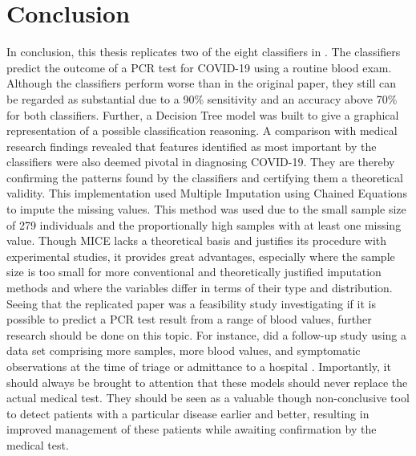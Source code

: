 \section{Conclusion}
In conclusion, this thesis replicates two of the eight classifiers in 
\cite{RN127}. The classifiers predict the outcome of a PCR test for COVID-19 
using a routine blood exam. Although the classifiers perform worse than in the 
original paper, they still can be regarded as substantial due to a 90\% 
sensitivity and an accuracy above 70\% for both classifiers.
Further, a Decision Tree model was built to give a graphical representation of 
a possible classification reasoning.
A comparison with medical research findings revealed that features 
identified as most important by the classifiers were also deemed pivotal in 
diagnosing COVID-19. They are thereby confirming the patterns found by the 
classifiers and certifying them a theoretical validity.
This implementation used Multiple Imputation using Chained Equations to impute 
the missing values. This method was used due to the small sample size of 279 
individuals and the proportionally high samples with at least one 
missing value. Though MICE lacks a theoretical basis and justifies its 
procedure with experimental studies, it provides great advantages, especially 
where the sample size is too small for more conventional and theoretically 
justified imputation methods and where the variables differ in terms of their 
type and distribution.
Seeing that the replicated paper was a feasibility study investigating if it is 
possible to predict a PCR test result from a range of blood values, further 
research should be done on this topic. For instance, \citeauthor{RN127} did a 
follow-up study using a data set comprising more samples, more blood values, 
and symptomatic observations at the time of triage or admittance to a hospital 
\cite{RN179}.
Importantly, it should always be brought to attention that these 
models should never replace the actual medical test. They should be seen as a 
valuable 
though non-conclusive tool to detect patients with a particular disease earlier 
and better, resulting in improved management of these patients while awaiting 
confirmation by the medical test.

